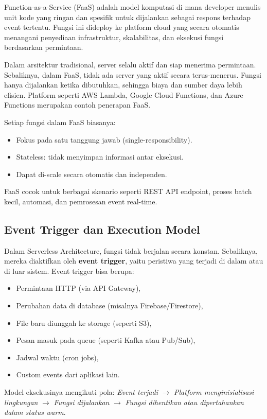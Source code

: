 Function-as-a-Service (FaaS) adalah model komputasi di mana developer menulis unit kode yang ringan dan spesifik untuk dijalankan sebagai respons terhadap event tertentu. Fungsi ini dideploy ke platform cloud yang secara otomatis menangani penyediaan infrastruktur, skalabilitas, dan eksekusi fungsi berdasarkan permintaan.

Dalam arsitektur tradisional, server selalu aktif dan siap menerima permintaan. Sebaliknya, dalam FaaS, tidak ada server yang aktif secara terus-menerus. Fungsi hanya dijalankan ketika dibutuhkan, sehingga biaya dan sumber daya lebih efisien. Platform seperti AWS Lambda, Google Cloud Functions, dan Azure Functions merupakan contoh penerapan FaaS.

Setiap fungsi dalam FaaS biasanya:
\begin{itemize}
	\item Fokus pada satu tanggung jawab (single-responsibility).
	\item Stateless: tidak menyimpan informasi antar eksekusi.
	\item Dapat di-scale secara otomatis dan independen.
\end{itemize}

FaaS cocok untuk berbagai skenario seperti REST API endpoint, proses batch kecil, automasi, dan pemrosesan event real-time.

\subsection{Event Trigger dan Execution Model}

Dalam Serverless Architecture, fungsi tidak berjalan secara konstan. Sebaliknya, mereka diaktifkan oleh \textbf{event trigger}, yaitu peristiwa yang terjadi di dalam atau di luar sistem. Event trigger bisa berupa:
\begin{itemize}
	\item Permintaan HTTP (via API Gateway),
	\item Perubahan data di database (misalnya Firebase/Firestore),
	\item File baru diunggah ke storage (seperti S3),
	\item Pesan masuk pada queue (seperti Kafka atau Pub/Sub),
	\item Jadwal waktu (cron jobs),
	\item Custom events dari aplikasi lain.
\end{itemize}

Model eksekusinya mengikuti pola: \textit{Event terjadi} $\rightarrow$ \textit{Platform menginisialisasi lingkungan} $\rightarrow$ \textit{Fungsi dijalankan} $\rightarrow$ \textit{Fungsi dihentikan atau dipertahankan dalam status warm}.

